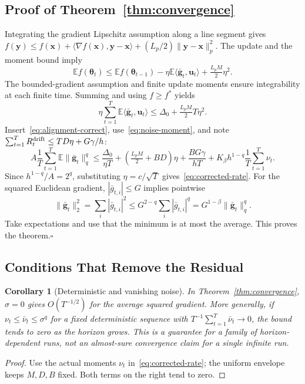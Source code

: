 \documentclass{article}
\newtheorem{corollary}{Corollary}
\begin{document}
\subsection{Proof of Theorem~\ref{thm:convergence}}
Integrating the gradient Lipschitz assumption along a line segment gives
$f(\mathbf{y})\le f(\mathbf{x})+\langle\nabla f(\mathbf{x}),\mathbf{y}-\mathbf{x}\rangle+(L_p/2)\|\mathbf{y}-\mathbf{x}\|_p^2$.
The update and the moment bound imply
\begin{equation}
\mathbb E f(\bm{\theta}_t)\le\mathbb E f(\bm{\theta}_{t-1})
-\eta\mathbb E\langle\bar{\mathbf{g}}_t,\mathbf{u}_t\rangle+\tfrac{L_pM}2\eta^2.
\end{equation}
The bounded-gradient assumption and finite update moments ensure integrability at each finite time. Summing and using $f\ge f^*$ yields
\begin{equation}
\eta\sum_{t=1}^T\mathbb E\langle\bar{\mathbf{g}}_t,\mathbf{u}_t\rangle\le\Delta_0+\tfrac{L_pM}2T\eta^2.
\end{equation}
Insert~\eqref{eq:alignment-correct}, use~\eqref{eq:noise-moment}, and note $\sum_{t=1}^TR_t^{\rm drift}\le TD\eta+G\gamma/h$:
\begin{equation}\label{eq:master-bound}
A\frac1T\sum_{t=1}^T\mathbb E\|\bar{\mathbf{g}}_t\|_q^q
\le\frac{\Delta_0}{\eta T}+\left(\tfrac{L_pM}2+BD\right)\eta
+\frac{BG\gamma}{hT}+K_\beta h^{1-q}\frac1T\sum_{t=1}^T\nu_t.
\end{equation}
Since $h^{1-q}/A=2^q$, substituting $\eta=c/\sqrt T$ gives~\eqref{eq:corrected-rate}. For the squared Euclidean gradient, $|\bar g_{t,i}|\le G$ implies pointwise
\begin{equation}\label{eq:correct-norm-conversion}
\|\bar{\mathbf{g}}_t\|_2^2=\sum_i|\bar g_{t,i}|^2
\le G^{2-q}\sum_i|\bar g_{t,i}|^q=G^{1-\beta}\|\bar{\mathbf{g}}_t\|_q^q.
\end{equation}
Take expectations and use that the minimum is at most the average. This proves the theorem.\hfill$\square$

\subsection{Conditions That Remove the Residual}
\begin{corollary}[Deterministic and vanishing noise]\label{cor:vanishing}
In Theorem~\ref{thm:convergence}, $\sigma=0$ gives $O(T^{-1/2})$ for the average squared gradient. More generally, if $\nu_t\le\bar\nu_t\le\sigma^q$ for a fixed deterministic sequence with $T^{-1}\sum_{t=1}^T\bar\nu_t\to0$, the bound tends to zero as the horizon grows. This is a guarantee for a family of horizon-dependent runs, not an almost-sure convergence claim for a single infinite run.
\end{corollary}
\begin{proof}
Use the actual moments $\nu_t$ in~\eqref{eq:corrected-rate}; the uniform envelope keeps $M,D,B$ fixed. Both terms on the right tend to zero.
\end{proof}
\end{document}
